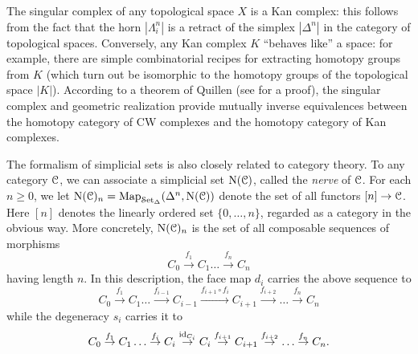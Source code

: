 The singular complex of any topological space $X$ is a Kan complex: this follows from the fact that the horn $| \Lambda^n_i |$ is a retract of the simplex $| \Delta^n |$ in the category of topological spaces. Conversely, any Kan complex $K$ ``behaves like'' a space: for example, there are simple combinatorial recipes for extracting homotopy groups from $K$ (which turn out be isomorphic to the homotopy groups of the topological space $|K|$). According to a theorem of Quillen (see \cite{goerssjardine} for a proof), the singular complex and geometric realization provide mutually inverse equivalences between the homotopy category of CW complexes and the homotopy category of Kan complexes.

The formalism of simplicial sets is also closely related to category theory. To any category $\operatorname{\mathcal{C}}$, we can associate a simplicial set $\operatorname{N}(\operatorname{\mathcal{C}})$, called the {\it nerve} of $\operatorname{\mathcal{C}}$. For each $n \geq 0$, we 
let $\operatorname{N}(\operatorname{\mathcal{C}})_{n} = \operatorname{{Map}}_{\operatorname{\mathcal{S}et_{\Delta}}}(\Delta^n, \operatorname{N}(\operatorname{\mathcal{C}}))$ denote the set of all functors $[n]
\rightarrow \operatorname{\mathcal{C}}$. Here $[n]$ denotes the linearly ordered set $\{ 0, \ldots, n \}$, regarded as a category in the obvious way. More
concretely, $\operatorname{N}(\operatorname{\mathcal{C}})_n$ is the set of all composable
sequences of morphisms
$$ C_0 \stackrel{f_1}{\rightarrow} C_1 \ldots \stackrel{f_n}{\rightarrow} C_n$$ having length $n$.
In this description, the face map $d_i$ carries the above sequence
to
$$C_0 \stackrel{f_1}{\rightarrow} C_1 \ldots \stackrel{f_{i-1}}{\rightarrow}
C_{i-1} \stackrel{ f_{i+1} \circ f_i }{\rightarrow} C_{i+1}
\stackrel{f_{i+2}}{\rightarrow} \ldots
\stackrel{f_{n}}{\rightarrow} C_n$$ while the degeneracy $s_i$
carries it to $$C_0 \stackrel{f_1}{\rightarrow} C_1 \ldots
\stackrel{f_i}{\rightarrow} C_i \stackrel{\operatorname{id}_{C_i}}{\rightarrow}
C_i \stackrel{f_{i+1}}{\rightarrow} C_{i+1}
\stackrel{f_{i+2}}{\rightarrow} \ldots \stackrel{f_n}{\rightarrow}
C_n.$$

